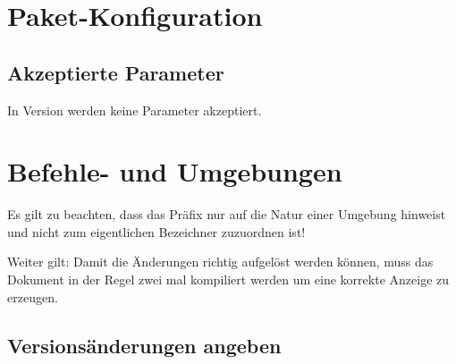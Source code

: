 \documentclass{sopra-base}
\begin{document}
\section{Paket-Konfiguration}    
    \subsection{Akzeptierte Parameter}
    In Version \thesocversion{} werden keine Parameter akzeptiert.

%
%
%
%

\section{Befehle- und Umgebungen}

Es gilt zu beachten, dass das Präfix  nur auf die Natur einer Umgebung hinweist und nicht zum eigentlichen Bezeichner zuzuordnen ist!\par{}
Weiter gilt: Damit die Änderungen richtig aufgelöst werden können, muss das Dokument
in der Regel zwei mal kompiliert werden um eine korrekte Anzeige zu erzeugen.

\subsection{Versionsänderungen angeben}
\end{document}
